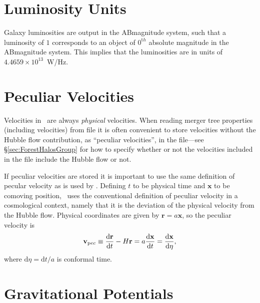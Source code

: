 \section{Luminosity Units}

Galaxy luminosities are output in the \gls{ABmagnitude} system, such that a luminosity of $1$ corresponds to an object of $0^{\mathrm th}$ absolute magnitude in the \gls{ABmagnitude} system. This implies that the luminosities are in units of $4.4659\times 10^{13}$~W/Hz.

\section{Peculiar Velocities}\label{sec:GalacticusVelocityDefinitions}

Velocities in \glc\ are always \emph{physical} velocities. When reading merger tree properties (including velocities) from file it is often convenient to store velocities without the Hubble flow contribution, as ``peculiar velocities'', in the file---see \S\ref{sec:ForestHalosGroup} for how to specify whether or not  the velocities included in the file include the Hubble flow or not.

If peculiar velocities are stored it is important to use the same definition of pecular velocity as is used by \glc. Defining $t$ to be physical time and ${\mathbf x}$ to be comoving position, \glc\ uses the conventional definition of peculiar velocity in a cosmological context, namely that it is the deviation of the physical velocity from the Hubble flow. Physical coordinates are given by ${\mathbf r} = a{\mathbf x}$, so the peculiar velocity is
\begin{equation}
{\mathbf v}_{\mathrm pec} \equiv {{\mathrm d} {\mathbf r} \over {\mathrm d} t} - H {\mathbf r} = a {{\mathrm d} {\mathbf x}\over{\mathrm d} t} = {{\mathrm d}{\mathbf x}\over{\mathrm d}\eta},
\end{equation}
where ${\mathrm d}\eta = {\mathrm d}t/a$ is conformal time. 

\section{Gravitational Potentials}

